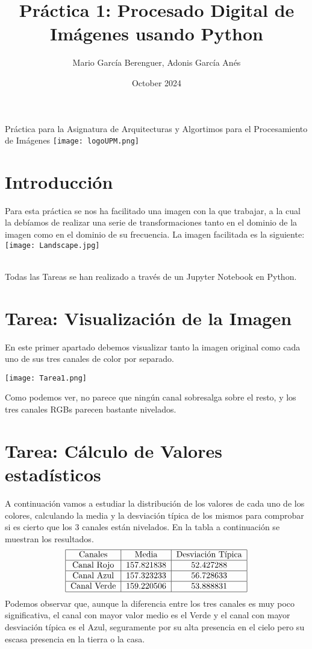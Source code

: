 \documentclass{article}
\title{Práctica 1: Procesado Digital de Imágenes usando Python}
\author{Mario García Berenguer, Adonis García Anés}
\date{October 2024}
\begin{document}
\maketitle
Práctica para la Asignatura de Arquitecturas y Algortimos para el Procesamiento de Imágenes
\centering
\texttt{[image: logoUPM.png]}

\section{Introducción}
\raggedright
Para esta práctica se nos ha facilitado una imagen con la que trabajar, a la cual la debíamos de realizar una serie de transformaciones tanto en el dominio de la imagen como en el dominio de su frecuencia. La imagen facilitada es la siguiente:
\\
\vspace{0.5cm}
\centering
\texttt{[image: Landscape.jpg]}
\raggedright
\\
Todas las Tareas se han realizado a través de un Jupyter Notebook en Python.
\section{Tarea: Visualización de la Imagen}

En este primer apartado debemos visualizar tanto la imagen original como cada uno de sus tres canales de color por separado.

\centering
\texttt{[image: Tarea1.png]}
\raggedright

Como podemos ver, no parece que ningún canal sobresalga sobre el resto, y los tres canales RGBs parecen bastante nivelados.

\section{Tarea: Cálculo de Valores estadísticos}

A continuación vamos a estudiar la distribución de los valores de cada uno de los colores, calculando la media y la desviación típica de los mismos para comprobar si es cierto que los 3 canales están nivelados. En la tabla a continuación se muestran los resultados.
\[
\begin{tabular}{|c|c|c|c|}
    \hline
    Canales & Media & Desviación Típica \\ \hline
    Canal Rojo & $157.821838$ & $52.427288$ \\ \hline
    Canal Azul & $157.323233$ & $56.728633$ \\ \hline
    Canal Verde & $159.220506$ & $53.888831$ \\ \hline
\end{tabular}
\]
Podemos observar que, aunque la diferencia entre los tres canales es muy poco significativa, el canal con mayor valor medio es el Verde y el canal con mayor desviación típica es el Azul, seguramente por su alta presencia en el cielo pero su escasa presencia en la tierra o la casa.
\end{document}
